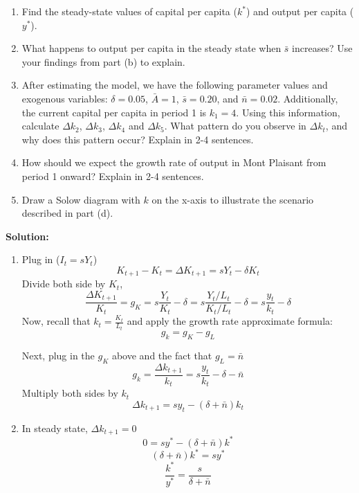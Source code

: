 \documentclass[addpoints,12pt,answers]{exam}
\begin{document}
\begin{questions}
\begin{enumerate}[label=(\alph*)]
			\item Find the steady-state values of capital per capita (\(k^*\)) and output per capita (\(y^*\)).
			
			\item What happens to output per capita in the steady state when \(\bar{s}\) increases? Use your findings from part (b) to explain.
			
			\item After estimating the model, we have the following parameter values and exogenous variables: \(\delta = 0.05\), \(\bar{A} = 1\), \(\bar{s} = 0.20\), and \(\bar{n} = 0.02\). Additionally, the current capital per capita in period 1 is \(k_1 = 4\). Using this information, calculate \(\Delta k_2\), \(\Delta k_3\), \(\Delta k_4\) and $\Delta k_5$. What pattern do you observe in \(\Delta k_t\), and why does this pattern occur? Explain in 2-4 sentences.
			
			\item How should we expect the growth rate of output in Mont Plaisant from period 1 onward? Explain in 2-4 sentences.
			
			\item Draw a Solow diagram with \(k\) on the x-axis to illustrate the scenario described in part (d).
			\end{enumerate}

		
		
		
		\newpage
		\textbf{Solution:}
		\begin{enumerate}[label=(\alph*)]
			\item Plug in ($I_t = s Y_t$)
			\[K_{t+1}- K_t = \Delta K_{t+1}=  sY_t -\delta K_t\]
			Divide both side by $K_t$,
			\[\frac{\Delta K_{t+1}}{K_t} = g_K  = s\frac{Y_t }{K_t}-\delta = s\frac{Y_t/L_t }{K_t/L_t}-\delta = s\frac{y_t }{k_t}-\delta\]
			Now, recall that $k_t = \frac{K_t}{L_t}$ and apply the growth rate approximate formula:
			\[g_k = g_K - g_L\]
			
			Next, plug in the $g_K$ above and the fact that $g_L = \bar{n}$
			\[g_k= \frac{\Delta k_{t+1}}{k_t} = s\frac{y_t }{k_t}-\delta - \bar{n}\]
			Multiply both sides by $k_t$
			\[\Delta k_{t+1} = sy_t- (\delta + \bar{n})k_t\]
			\item 
			In steady state, $\Delta k_{t+1} = 0$
			\[0 = sy^*- (\delta + \bar{n})k^*\]
			\[(\delta + \bar{n})k^* = sy^* \]
			\[\frac{k^*}{y^*} = \frac{s}{\delta + \bar{n}} \]
			

\end{enumerate}
\end{questions}
\end{document}
